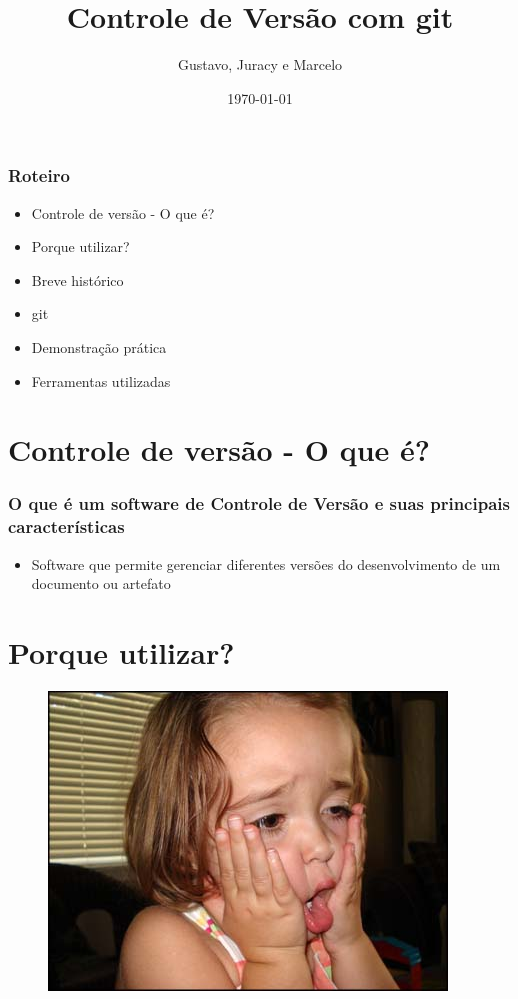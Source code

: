 \documentclass{beamer}
\title[Gerência de Configuração e Testes]{Controle de Versão com git}
\author[Grupo Masters]{Gustavo, Juracy e Marcelo}
\institute{Centro Universitário Jorge Amado}
\date{\today}
\begin{document}
  \frame{\titlepage}
    \begin{frame}
    \frametitle{Roteiro}
   	\begin{itemize}
      \item Controle de versão - O que é?
      \item Porque utilizar?
      \item Breve histórico
      \item git
      \item Demonstração prática
      \item Ferramentas utilizadas
    \end{itemize}
  \end{frame}

  \section{Controle de versão - O que é?}
  \begin{frame}
    \frametitle{O que é um software de Controle de Versão e suas principais características}
    \begin{itemize}
      \item Software que permite gerenciar diferentes versões do desenvolvimento de um documento ou artefato
    \end{itemize}
    \vfill
  \end{frame}

  \section{Porque utilizar?}
		\begin{frame}
    \begin{figure}[htb]
     \begin{center}
    	\includegraphics[scale=0.4]{panico.jpg}
     \end{center}
    \end{figure}
   \end{frame}
   
\end{document}
